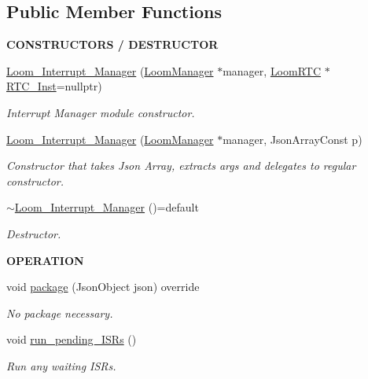 \subsection*{Public Member Functions}
\begin{Indent}{\bf C\+O\+N\+S\+T\+R\+U\+C\+T\+O\+RS / D\+E\+S\+T\+R\+U\+C\+T\+OR}\par
\begin{DoxyCompactItemize}
\item 
\hyperlink{class_loom___interrupt___manager_a5b12fcb72f0f5da323d63ab9a6ca95a5}{Loom\+\_\+\+Interrupt\+\_\+\+Manager} (\hyperlink{class_loom_manager}{Loom\+Manager} $\ast$manager, \hyperlink{class_loom_r_t_c}{Loom\+R\+TC} $\ast$\hyperlink{class_loom___interrupt___manager_af209a82a1929466fa1d00a14733120c6}{R\+T\+C\+\_\+\+Inst}=nullptr)
\begin{DoxyCompactList}\small\item\em Interrupt Manager module constructor. \end{DoxyCompactList}\item 
\hyperlink{class_loom___interrupt___manager_a5b23954e2888942d6370f82e2f790d6d}{Loom\+\_\+\+Interrupt\+\_\+\+Manager} (\hyperlink{class_loom_manager}{Loom\+Manager} $\ast$manager, Json\+Array\+Const p)
\begin{DoxyCompactList}\small\item\em Constructor that takes Json Array, extracts args and delegates to regular constructor. \end{DoxyCompactList}\item 
\hyperlink{class_loom___interrupt___manager_a0a389cd37e3266ab844ff0eed146082a}{$\sim$\+Loom\+\_\+\+Interrupt\+\_\+\+Manager} ()=default
\begin{DoxyCompactList}\small\item\em Destructor. \end{DoxyCompactList}\end{DoxyCompactItemize}
\end{Indent}
\begin{Indent}{\bf O\+P\+E\+R\+A\+T\+I\+ON}\par
\begin{DoxyCompactItemize}
\item 
void \hyperlink{class_loom___interrupt___manager_a5acb7bf173619dbd1a459800182767e6}{package} (Json\+Object json) override
\begin{DoxyCompactList}\small\item\em No package necessary. \end{DoxyCompactList}\item 
void \hyperlink{class_loom___interrupt___manager_ada590ee9e56b82b39a6cf443c6038efd}{run\+\_\+pending\+\_\+\+I\+S\+Rs} ()
\begin{DoxyCompactList}\small\item\em Run any waiting I\+S\+Rs. \end{DoxyCompactList}\end{DoxyCompactItemize}
\end{Indent}
